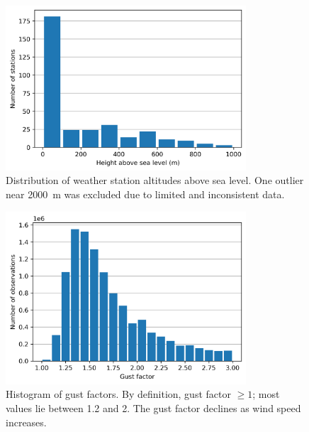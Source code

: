 \begin{figure}[ht]
  \centering
  \includegraphics[width=0.8\textwidth]{Figures/station_heights.png}
  \caption{Distribution of weather station altitudes above sea level. One outlier near 2000~m was excluded due to limited and inconsistent data.}
  \label{fig:station_heights}
\end{figure}

\begin{figure}[ht]
  \centering
  \includegraphics[width=0.8\textwidth]{Figures/gust_factor_2025.png}
  \caption{Histogram of gust factors. By definition, gust factor $\ge1$; most values lie between 1.2 and 2. The gust factor declines as wind speed increases.}
  \label{fig:gust_factors}
\end{figure}
